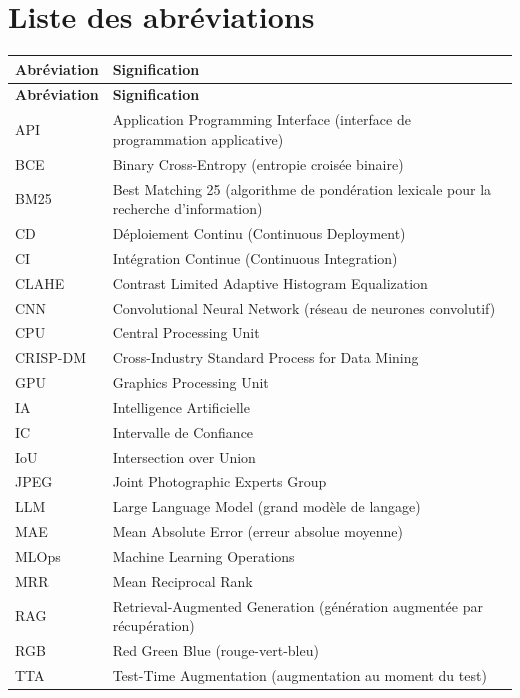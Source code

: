 \documentclass[12pt,a4paper]{report}
\begin{document}
\chapter*{Liste des abréviations}

\begin{longtable}{l p{10.5cm}}
\toprule
\textbf{Abréviation} & \textbf{Signification} \\
\midrule
\endfirsthead
\toprule
\textbf{Abréviation} & \textbf{Signification} \\
\midrule
\endhead
API & Application Programming Interface (interface de programmation applicative) \\
BCE & Binary Cross-Entropy (entropie croisée binaire) \\
BM25 & Best Matching 25 (algorithme de pondération lexicale pour la recherche d'information) \\
CD & Déploiement Continu (Continuous Deployment) \\
CI & Intégration Continue (Continuous Integration) \\
CLAHE & Contrast Limited Adaptive Histogram Equalization \\
CNN & Convolutional Neural Network (réseau de neurones convolutif) \\
CPU & Central Processing Unit \\
CRISP-DM & Cross-Industry Standard Process for Data Mining \\
GPU & Graphics Processing Unit \\
IA & Intelligence Artificielle \\
IC & Intervalle de Confiance \\
IoU & Intersection over Union \\
JPEG & Joint Photographic Experts Group \\
LLM & Large Language Model (grand modèle de langage) \\
MAE & Mean Absolute Error (erreur absolue moyenne) \\
MLOps & Machine Learning Operations \\
MRR & Mean Reciprocal Rank \\
RAG & Retrieval-Augmented Generation (génération augmentée par récupération) \\
RGB & Red Green Blue (rouge-vert-bleu) \\
TTA & Test-Time Augmentation (augmentation au moment du test) \\
\bottomrule
\end{longtable}
\end{document}
